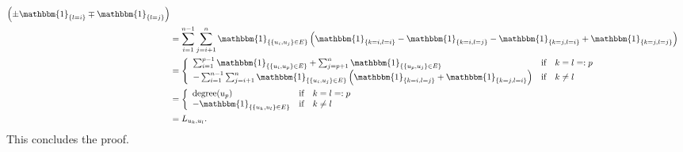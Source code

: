\documentclass[10pt,usenames,dvipsnames]{article}
\newcommand{\ind}{\mathbbm{1}} %
\newenvironment{exercise}[2][Exercise]{\begin{trivlist}
  \item[\hskip \labelsep {\bfseries #1}\hskip \labelsep {\bfseries #2.}]}{\end{trivlist}}
\begin{document}
\begin{exercise}{3a}
\begin{align*}
	\left(\pm \ind_{\left\{l=i\right\}} \mp  \ind_{\left\{l=j\right\}}\right) \\ 
	& = \sum_{i=1}^{n-1} \sum_{j=i+1}^n 
	\ind_{\left\{\{u_i,u_j\} \in E\right\}} \left(
		\ind_{\left\{k=i, l=i\right\}} 
		- \ind_{\left\{k=i, l=j\right\}} 
		- \ind_{\left\{k=j, l=i\right\}}
		+ \ind_{\left\{k=j, l=j\right\}} \right) \\ 
	& = \left\{ 
	\begin{array}{lcl}
		 \sum_{i=1}^{p-1}  \ind_{\left\{\{u_i,u_p\} \in E\right\}}
		 	+  \sum_{j=p+1}^{n}  \ind_{\left\{\{u_p,u_j\} \in E\right\}}  & \mbox{if} & k=l =: p \\ 
		 - \sum_{i=1}^{n-1} \sum_{j=i+1}^n \ind_{\left\{\{u_i,u_j\} \in E\right\}}
		 	\left( \ind_{\left\{k=i, l=j\right\}}  +\ind_{\left\{k=j, l=i\right\}} \right) & \mbox{if} & k\neq l 
	\end{array}
	\right. \\
	& = \left\{ 
	\begin{array}{lcl}
	\mbox{degree}(u_p)  & \mbox{if} & k=l =: p \\ 
	- \ind_{\left\{\{u_k,u_l\} \in E\right\}}  & \mbox{if} & k\neq l 
	\end{array}
	\right. \\
	& = L_{u_k, u_l}.
\end{align*}
This concludes the proof.
  \end{exercise}
\end{document}
